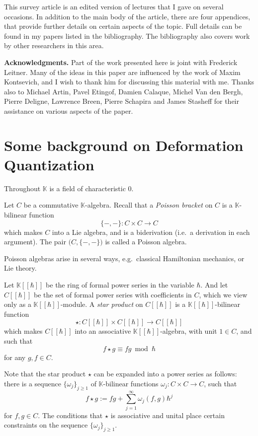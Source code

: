 \documentclass{conm-p-l}
\theoremstyle{definition}
\numberwithin{equation}{section}
\newcommand{\opn}{\operatorname}
\newcommand{\mbb}[1]{\mathbb{#1}}
\newcommand{\K}{\mbb{K}}
\begin{document}
This survey article is an edited version of lectures that I gave on several
occasions. In addition to the main body of the article, there are four
appendices, that provide further details on certain aspects of the topic. 
Full details can be found in my papers listed in the bibliography. The
bibliography also covers work by other researchers in this area. 


\medskip \noindent
\textbf{Acknowledgments.}
Part of the work presented here is joint with Frederick Leitner.
Many of the ideas in this paper are influenced by the work
of Maxim Kontsevich, and I wish to thank him for discussing this
material with me.
Thanks also to Michael Artin, Pavel Etingof, Damien
Calaque, Michel Van den Bergh, Pierre Deligne, 
Lawrence Breen, Pierre Schapira and James Stasheff 
for their assistance on various aspects of the paper. 




\section{Some background on Deformation Quantization}

Throughout $\K$ is a field of characteristic $0$.

Let $C$ be a commutative $\K$-algebra. 
Recall that a {\em Poisson bracket} on $C$ is a 
$\K$-bilinear function
\[ \{-,-\} : C \times C \to C \]
which makes $C$ into a Lie algebra, and is a biderivation (i.e.\ 
a derivation in each argument). 
The pair $\bigl( C, \{-,-\} \bigr)$ is called a Poisson algebra. 

Poisson algebras arise in several ways, e.g.\ classical Hamiltonian
mechanics, or Lie theory.

Let $\K[[\hbar]]$ be the ring of formal power series in the
variable $\hbar$. And let $C[[\hbar]]$ be the set of formal power series with
coefficients in $C$, which we view only as a 
$\K[[\hbar]]$-module. 
A {\em star product} on $C[[\hbar]]$ is a $\K[[\hbar]]$-bilinear function
\[ \star : C[[\hbar]] \times C[[\hbar]] \to C[[\hbar]]  \]
which makes $C[[\hbar]]$ into an associative 
$\K[[\hbar]]$-algebra, with unit $1 \in C$, and  such that 
\[ f \star g \equiv f g \ \opn{mod}\ \hbar \]
for any $g, f \in C$.

Note that the star product $\star$ can be expanded into a power series as
follows: there is a sequence $\{ \omega_j \}_{j \geq 1}$ of $\K$-bilinear
functions $\omega_j : C \times C \to C$, such that 
\begin{equation} \label{eqn:omega2}
f \star g := f g + 
\sum_{j = 1}^{\infty} \omega_j(f, g) \hbar^j
\end{equation}
for $f, g \in C$. The conditions that $\star$ is associative and unital place
certain constraints on the sequence $\{ \omega_j \}_{j \geq 1}$.
\end{document}
